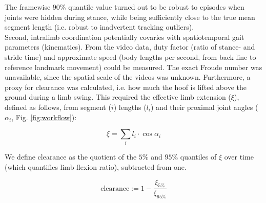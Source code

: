 The framewise $90\%$ quantile value turned out to be robust to episodes when joints were hidden during stance, while being sufficiently close to the true mean segment length (i.e. robust to inadvertent tracking outliers).
\\Second, intralimb coordination potentially covaries with spatiotemporal gait parameters (kinematics).
From the video data, duty factor (ratio of stance- and stride time) and approximate speed (body lengths per second, from back line to reference landmark movement) could be measured.
The exact Froude number was unavailable, since the spatial scale of the videos was unknown.
Furthermore, a proxy for clearance \citep[\textit{cf.}][]{Austin1999} was calculated, i.e. how much the hoof is lifted above the ground during a limb swing.
This required the effective limb extension ($\xi$), defined as follows, from segment ($i$) lengths ($l_{i}$) and their proximal joint angles ($\alpha_{i}$, Fig. \ref{fig:workflow}):

\begin{equation*}
\xi = \sum\limits_{i} l_{i} \cdot \cos{\alpha_{i}}
\end{equation*}

We define clearance as the quotient of the $5\%$ and $95\%$ quantiles of $\xi$ over time (which quantifies limb flexion ratio), subtracted from one.

\begin{equation*}
\text{clearance} := 1 - \frac{\xi_{5\%}}{\xi_{95\%}}
\end{equation*}

